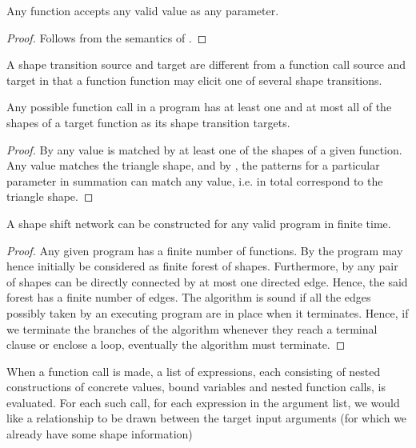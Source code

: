 \begin{lemma}\label{lemma:extend-any-function-any-value} Any function accepts
any valid \D{} value as any parameter.\end{lemma}

\begin{proof} Follows from the semantics of \D{}.\end{proof}

\begin{definition} A shape transition source and target are different from a
function call source and target in that a function function may elicit one of
several shape transitions.\end{definition}

\begin{lemma}\label{lemma:extend-any-call-targets} Any possible function call in a program has at least one and at
most all of the shapes of a target function as its shape transition
targets.\end{lemma}

\begin{proof} By  any value is
matched by at least one of the shapes of a given function. Any value matches
the triangle shape, and by , the
patterns for a particular parameter in summation can match any value, i.e. in
total correspond to the triangle shape.\end{proof}

\begin{theorem} A shape shift network can be constructed for any valid program
in finite time.\end{theorem}

\begin{proof} Any given program has a finite number of functions. By
 the program may hence initially be
considered as finite forest of shapes. Furthermore, by
 any pair of shapes can be directly
connected by at most one directed edge. Hence, the said forest has a finite
number of edges. The algorithm is sound if all the edges possibly taken by an
executing program are in place when it terminates.  Hence, if we terminate the
branches of the algorithm whenever they reach a terminal clause or enclose a
loop, eventually the algorithm must terminate.\end{proof}


When a function call is made, a list of expressions, each consisting of nested
constructions of concrete values, bound variables and nested function calls, is
evaluated. For each such call, for each expression in the argument list, we
would like a relationship to be drawn between the target input arguments (for
which we already have some shape information) 


